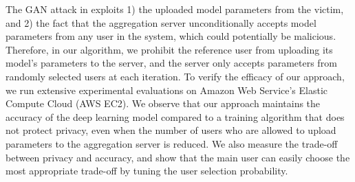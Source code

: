 \documentclass[conference]{IEEEtran}
\begin{document}
The GAN attack in \cite{hitaj2017deep} exploits 1) the uploaded
model parameters from the victim, and 2) the fact that the  aggregation server unconditionally accepts model parameters from any user
in the system, which could potentially be malicious. Therefore, in our algorithm, we prohibit the reference user from uploading its
model's parameters to the server, and the server only accepts parameters from randomly selected users at each iteration. 
To verify the efficacy of our approach, we run extensive experimental evaluations on Amazon Web Service's Elastic
Compute Cloud (AWS EC2). We observe that our approach maintains the accuracy of the deep learning model compared to a training
algorithm that does not protect privacy, even when the number of users who are allowed to upload parameters to the aggregation
server is reduced. We also measure the trade-off between privacy and accuracy, and show that the main user can easily choose the most
appropriate trade-off by tuning the user selection probability. 



\end{document}

